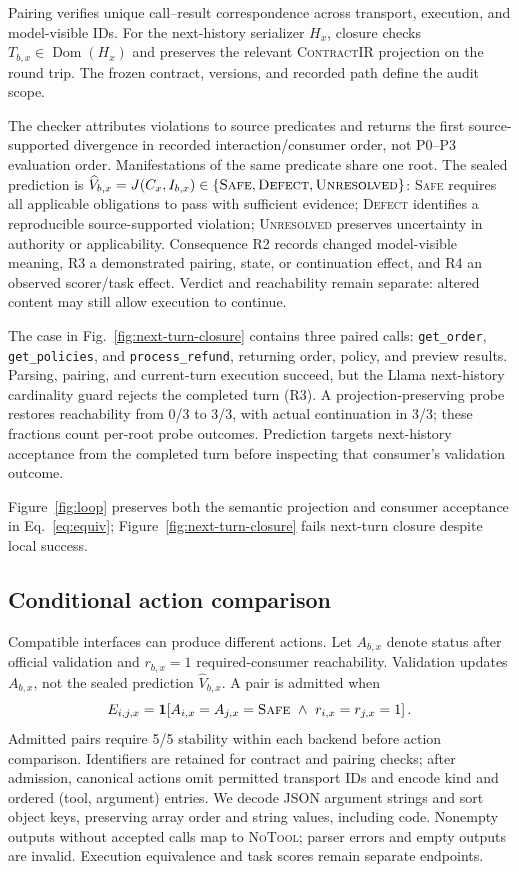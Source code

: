\documentclass[letterpaper]{article}
\newcommand{\contractir}{\textsc{ContractIR}\xspace}
\begin{document}
Pairing verifies unique call--result correspondence across transport,
execution, and model-visible IDs. For the next-history serializer $H_x$,
closure checks $T_{b,x}\in\operatorname{Dom}(H_x)$ and preserves the relevant
\contractir projection on the round trip.
The frozen contract, versions, and recorded path define the audit scope.

The checker attributes violations to source predicates and returns the
first source-supported divergence in recorded interaction/consumer order, not
P0--P3 evaluation order. Manifestations of the same predicate share one root.
The sealed prediction is
$\widehat V_{b,x}=J(C_x,I_{b,x})\in
\{\textsc{Safe},\textsc{Defect},\textsc{Unresolved}\}$:
\textsc{Safe} requires all applicable obligations to pass with sufficient
evidence; \textsc{Defect} identifies a reproducible source-supported violation;
\textsc{Unresolved} preserves uncertainty in authority or applicability.
Consequence R2 records changed model-visible meaning, R3 a demonstrated
pairing, state, or continuation effect, and R4 an observed scorer/task effect.
Verdict and reachability remain separate: altered content may still allow
execution to continue.

The case in Fig.~\ref{fig:next-turn-closure} contains three paired calls:
\texttt{get\_order}, \texttt{get\_policies}, and \texttt{process\_refund},
returning order, policy, and preview results. Parsing, pairing, and
current-turn execution succeed, but the Llama next-history cardinality guard
rejects the completed turn (R3). A projection-preserving probe restores
reachability from 0/3 to 3/3, with actual continuation in 3/3; these fractions
count per-root probe outcomes.
Prediction targets next-history acceptance from the completed turn before
inspecting that consumer's validation outcome.

Figure~\ref{fig:loop} preserves both the semantic projection and consumer
acceptance in Eq.~\eqref{eq:equiv}; Figure~\ref{fig:next-turn-closure} fails
next-turn closure despite local success.

\newpage
\subsection{Conditional action comparison}
Compatible interfaces can produce different actions. Let $A_{b,x}$ denote
status after official validation and $r_{b,x}=1$ required-consumer reachability.
Validation updates $A_{b,x}$, not the sealed prediction $\widehat V_{b,x}$.
A pair is admitted when
\begin{equation}
 E_{i,j,x}=\mathbf 1\!\left[
 A_{i,x}=A_{j,x}=\textsc{Safe}\ \land\ r_{i,x}=r_{j,x}=1\right].
 \label{eq:gate}
\end{equation}
Admitted pairs require 5/5 stability within each backend before action comparison.
Identifiers are retained for contract and pairing checks; after admission,
canonical actions omit permitted transport IDs and encode kind and ordered
(tool, argument) entries. We decode JSON argument strings and sort object keys,
preserving array order and string values, including code.
Nonempty outputs without accepted calls map to \textsc{NoTool};
parser errors and empty outputs are invalid. Execution equivalence and task
scores remain separate endpoints.
\end{document}

